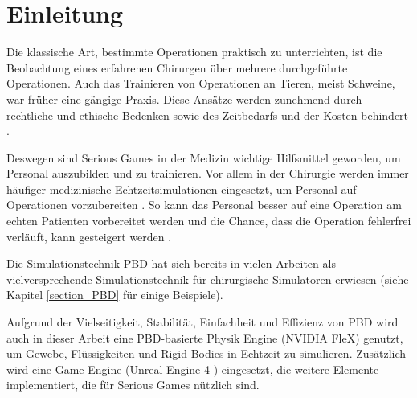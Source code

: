 \chapter{Einleitung}
\label{Motivation und Problemstellung}



Die klassische Art, bestimmte Operationen praktisch zu unterrichten, ist die Beobachtung eines erfahrenen Chirurgen über mehrere durchgeführte Operationen. Auch das Trainieren von Operationen an Tieren, meist Schweine, war früher eine gängige Praxis. Diese Ansätze werden zunehmend durch rechtliche und ethische Bedenken sowie des Zeitbedarfs und der Kosten behindert \cite{SurgSim}.

Deswegen sind Serious Games in der Medizin wichtige Hilfsmittel geworden, um 
Personal  %
auszubilden und zu trainieren. Vor allem in der Chirurgie werden immer häufiger medizinische Echtzeitsimulationen eingesetzt, um Personal auf Operationen vorzubereiten \cite{SimRole}. So kann das Personal besser auf eine Operation am echten Patienten vorbereitet werden und die Chance, dass die Operation fehlerfrei verläuft, kann gesteigert werden \cite{VRNeuro}.

Die Simulationstechnik \ac{PBD} \cite{PBD} hat sich bereits in vielen Arbeiten als vielversprechende Simulationstechnik für chirurgische Simulatoren erwiesen (siehe Kapitel \ref{section_PBD} für einige Beispiele). 

Aufgrund der Vielseitigkeit, Stabilität, Einfachheit und Effizienz von PBD wird auch in dieser Arbeit eine PBD-basierte Physik Engine (NVIDIA FleX) genutzt, um Gewebe, Flüssigkeiten und Rigid Bodies in Echtzeit zu simulieren. Zusätzlich wird eine Game Engine (Unreal Engine 4 \cite{UE4FlexDoc}) eingesetzt, die weitere Elemente implementiert, die für Serious Games nützlich sind. 

